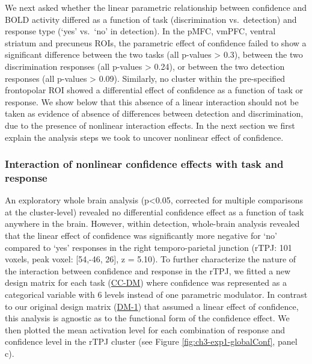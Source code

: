 \documentclass[12pt,twoside]{reedthesis}
\begin{document}
We next asked whether the linear parametric relationship between confidence and BOLD activity differed as a function of task (discrimination vs.~detection) and response type (`yes' vs.~`no' in detection). In the pMFC, vmPFC, ventral striatum and precuneus ROIs, the parametric effect of confidence failed to show a significant difference between the two tasks (all p-values \textgreater{} 0.3), between the two discrimination responses (all p-values \textgreater{} 0.24), or between the two detection responses (all p-values \textgreater{} 0.09). Similarly, no cluster within the pre-specified frontopolar ROI showed a differential effect of confidence as a function of task or response. We show below that this absence of a linear interaction should not be taken as evidence of absence of differences between detection and discrimination, due to the presence of nonlinear interaction effects. In the next section we first explain the analysis steps we took to uncover nonlinear effect of confidence.

\hypertarget{interaction-of-nonlinear-confidence-effects-with-task-and-response}{%
\subsubsection*{Interaction of nonlinear confidence effects with task and response}\label{interaction-of-nonlinear-confidence-effects-with-task-and-response}}

An exploratory whole brain analysis (p\textless0.05, corrected for multiple comparisons at the cluster-level) revealed no differential confidence effect as a function of task anywhere in the brain. However, within detection, whole-brain analysis revealed that the linear effect of confidence was significantly more negative for `no' compared to `yes' responses in the right temporo-parietal junction (rTPJ: 101 voxels, peak voxel: {[}54,-46, 26{]}, z = 5.10). To further characterize the nature of the interaction between confidence and response in the rTPJ, we fitted a new design matrix for each task (\protect\hyperlink{categoricalDM}{CC-DM}) where confidence was represented as a categorical variable with 6 levels instead of one parametric modulator. In contrast to our original design matrix (\protect\hyperlink{DM-1}{DM-1}) that assumed a linear effect of confidence, this analysis is agnostic as to the functional form of the confidence effect. We then plotted the mean activation level for each combination of response and confidence level in the rTPJ cluster (see Figure \ref{fig:ch3-exp1-globalConf}, panel c).
\end{document}
